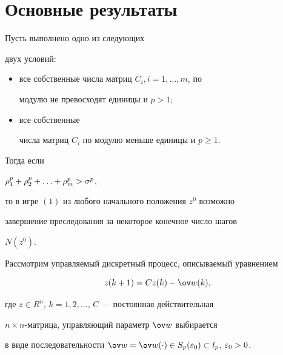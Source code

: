 \section{Основные результаты}





\begin{thm}


Пусть выполнено одно из следующих


двух условий\/${:}$


\begin{itemize}


\item[1)] все собственные числа матриц $C_i, i=1,\dotsc,m$, по


модулю не превосходят единицы и $p > 1;$ 


\item[2)] все собственные


числа матриц $C_i $ по модулю меньше единицы и $p \geq 1$.


\end{itemize}





Тогда если


$\rho_1^{p} + \rho_2^{p} + \dotsc + \rho_m^{p} > \sigma^p$,


то в игре $(1)$ из любого начального положения $z^0 $ возможно


завершение преследования за некоторое конечное число шагов


$N(z^0)$.


\end{thm}





Рассмотрим управляемый дискретный процесс, описываемый уравнением


\begin{equation}


z(k+1) = Cz(k) - {\ov w}(k),


\end{equation}


где $z \in R^n$, $k = 1,2,\dotsc$, $C$ --- постоянная действительная 


$n\times n$-матрица, управляющий параметр ${\ov w} $ выбирается


в виде последовательности ${\ov w} = {\ov w}(\cc) \in


S_p(\ve_0) \su l_p$, $\ve_0 >0$.





